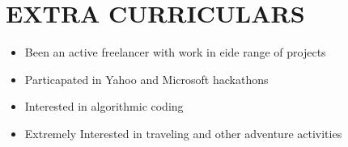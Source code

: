 \documentclass[fontsize=10pt]{tccv}
\begin{document}
\vspace{-7mm}
\section{EXTRA CURRICULARS}

\begin{itemize}
\itemsep-0.3em
\item Been an active freelancer with work in eide range of projects
\item Particapated in Yahoo and Microsoft hackathons
\item Interested in algorithmic coding
\item Extremely Interested in traveling and other adventure activities
\end{itemize}
\end{document}
